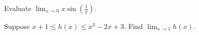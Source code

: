 \documentclass[../main.tex]{subfiles}
\begin{document}
  \begin{example}
    Evaluate \(\lim_{x \to 0} x \sin\left(\frac{1}{x}\right)\).

    \hfill
  \end{example}
  \clearpage

  \begin{example}
    Suppose \(x+1 \le h(x) \le x^{3} - 2x + 3\). Find \(\lim_{x \to 1} h(x)\).

  \end{example}
\end{document}
